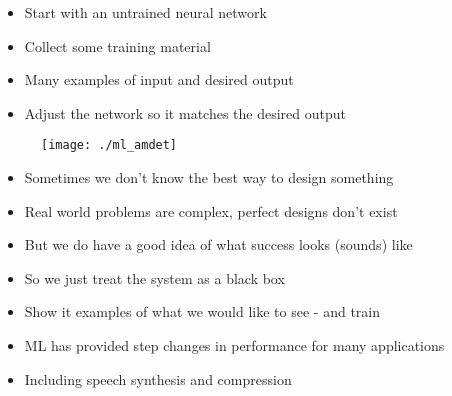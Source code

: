 \documentclass{beamer}
\begin{document}
\begin{frame}
\begin{itemize}
	\item Start with an untrained neural network
	\item Collect some training material
	\item Many examples of input and desired output
	\item Adjust the network so it matches the desired output
\end{itemize}



\end{frame}

\begin{frame}

\begin{figure}
\centering
\texttt{[image: ./ml\_amdet]}
\end{figure}
  
\end{frame}

\begin{frame}
\begin{itemize}
	\item Sometimes we don't know the best way to design something
	\item Real world problems are complex, perfect designs don't exist
	\item But we do have a good idea of what success looks (sounds) like
	\item So we just treat the system as a black box
	\item Show it examples of what we would like to see - and train
	\item ML has provided step changes in performance for many applications
	\item Including speech synthesis and compression
\end{itemize}
\end{frame}
\end{document}
